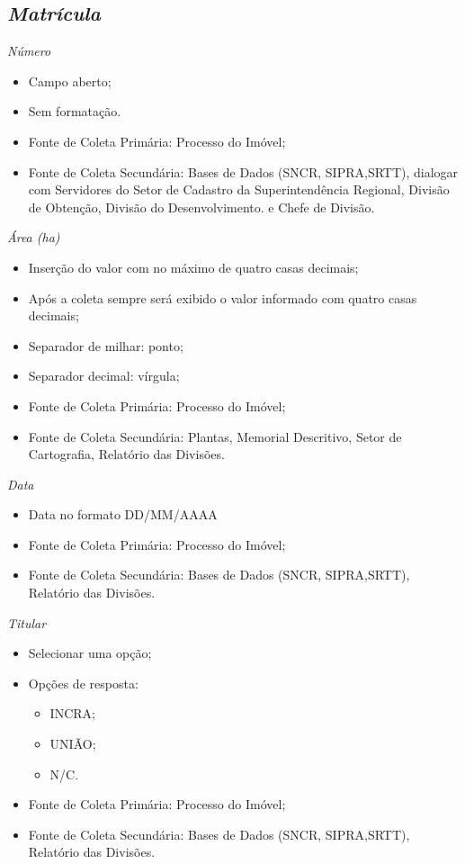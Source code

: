\documentclass[
  letterpaper,
]{report}
\providecommand{\tightlist}{%
  \setlength{\itemsep}{0pt}\setlength{\parskip}{0pt}}\usepackage{longtable,booktabs,array}
\begin{document}
\hypertarget{matruxedcula}{%
\subsection{\texorpdfstring{\emph{Matrícula}}{Matrícula}}\label{matruxedcula}}

\emph{Número}

\begin{itemize}
\tightlist
\item
  Campo aberto;
\item
  Sem formatação.
\item
  Fonte de Coleta Primária: Processo do Imóvel;
\item
  Fonte de Coleta Secundária: Bases de Dados (SNCR, SIPRA,SRTT),
  dialogar com Servidores do Setor de Cadastro da Superintendência
  Regional, Divisão de Obtenção, Divisão do Desenvolvimento. e Chefe de
  Divisão.
\end{itemize}

\emph{Área (ha)}

\begin{itemize}
\tightlist
\item
  Inserção do valor com no máximo de quatro casas decimais;
\item
  Após a coleta sempre será exibido o valor informado com quatro casas
  decimais;
\item
  Separador de milhar: ponto;
\item
  Separador decimal: vírgula;
\item
  Fonte de Coleta Primária: Processo do Imóvel;
\item
  Fonte de Coleta Secundária: Plantas, Memorial Descritivo, Setor de
  Cartografia, Relatório das Divisões.
\end{itemize}

\emph{Data}

\begin{itemize}
\tightlist
\item
  Data no formato DD/MM/AAAA
\item
  Fonte de Coleta Primária: Processo do Imóvel;
\item
  Fonte de Coleta Secundária: Bases de Dados (SNCR, SIPRA,SRTT),
  Relatório das Divisões.
\end{itemize}

\emph{Titular}

\begin{itemize}
\tightlist
\item
  Selecionar uma opção;
\item
  Opções de resposta:

  \begin{itemize}
  \tightlist
  \item
    INCRA;
  \item
    UNIÃO;
  \item
    N/C.
  \end{itemize}
\item
  Fonte de Coleta Primária: Processo do Imóvel;
\item
  Fonte de Coleta Secundária: Bases de Dados (SNCR, SIPRA,SRTT),
  Relatório das Divisões.
\end{itemize}
\end{document}
